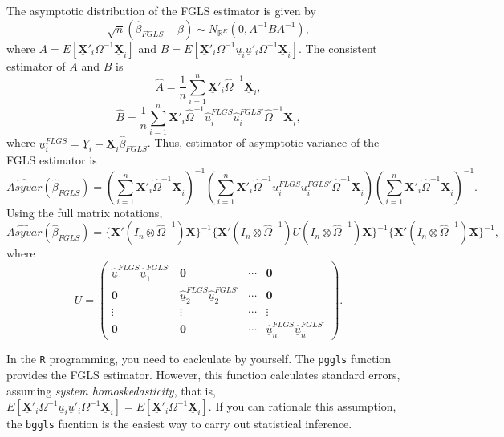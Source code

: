 \documentclass[
  12pt,
]{article}
\begin{document}
The asymptotic distribution of the FGLS estimator is given by
\[
  \sqrt{n}(\hat{\beta}_{FGLS} - \beta) \sim N_{\mathbb{R}^K}(0, A^{-1} B A^{-1}),
\]
where \(A = E[\underline{\mathbf{X}}'_i \Omega^{-1} \underline{\mathbf{X}}_i]\)
and \(B = E[\underline{\mathbf{X}}'_i \Omega^{-1} \underline{u}_i \underline{u}'_i \Omega^{-1} \underline{\mathbf{X}}_i]\).
The consistent estimator of \(A\) and \(B\) is
\[
  \hat{A} = \frac{1}{n} \sum_{i=1}^n \underline{\mathbf{X}}'_i \hat{\Omega}^{-1} \underline{\mathbf{X}}_i,
\]
\[
  \hat{B} 
  = \frac{1}{n} \sum_{i=1}^n
  \underline{\mathbf{X}}'_i \hat{\Omega}^{-1} 
  \underline{\hat{u}}^{FLGS}_i \underline{\hat{u}}^{FGLS'}_i 
  \hat{\Omega}^{-1} \underline{\mathbf{X}}_i,
\]
where \(\underline{u}^{FLGS}_i = \underline{Y}_i - \underline{\mathbf{X}}_i \hat{\beta}_{FGLS}\).
Thus, estimator of asymptotic variance of the FGLS estimator is
\[
  \widehat{Asyvar}(\hat{\beta}_{FGLS}) =
  \left( \sum_{i=1}^n \underline{\mathbf{X}}'_i \hat{\Omega}^{-1} \underline{\mathbf{X}}_i \right)^{-1}
  \left( \sum_{i=1}^n \underline{\mathbf{X}}'_i \hat{\Omega}^{-1} 
  \underline{u}^{FLGS}_i \underline{u}^{FGLS'}_i 
  \hat{\Omega}^{-1} \underline{\mathbf{X}}_i \right)
  \left( \sum_{i=1}^n \underline{\mathbf{X}}'_i \hat{\Omega}^{-1} \underline{\mathbf{X}}_i \right)^{-1}.
\]
Using the full matrix notations,
\[
  \widehat{Asyvar}(\hat{\beta}_{FGLS}) =
  \{ \mathbf{X}'(I_n \otimes \hat{\Omega}^{-1}) \mathbf{X} \}^{-1}
  \{ \mathbf{X}'(I_n \otimes \hat{\Omega}^{-1}) U (I_n \otimes \hat{\Omega}^{-1}) \mathbf{X} \}^{-1}
  \{ \mathbf{X}'(I_n \otimes \hat{\Omega}^{-1}) \mathbf{X} \}^{-1},
\]
where
\[
  U = 
  \begin{pmatrix}
    \underline{\hat{u}}^{FLGS}_1 \underline{\hat{u}}^{FGLS'}_1 & \mathbf{0} & \cdots & \mathbf{0} \\
    \mathbf{0} & \underline{\hat{u}}^{FLGS}_2 \underline{\hat{u}}^{FGLS'}_2 & \cdots & \mathbf{0} \\
    \vdots & \vdots & \cdots & \vdots \\
    \mathbf{0} & \mathbf{0} & \cdots & \underline{\hat{u}}^{FLGS}_n \underline{\hat{u}}^{FGLS'}_n
  \end{pmatrix}.
\]

In the \texttt{R} programming,
you need to caclculate by yourself.
The \texttt{pggls} function provides the FGLS estimator.
However, this function calculates standard errors, assuming \emph{system homoskedasticity}, that is,
\(E[\underline{\mathbf{X}}'_i \Omega^{-1} \underline{u}_i \underline{u}'_i \Omega^{-1} \underline{\mathbf{X}}_i] = E[\underline{\mathbf{X}}'_i \Omega^{-1} \underline{\mathbf{X}}_i]\).
If you can rationale this assumption,
the \texttt{bggls} fucntion is the easiest way to carry out statistical inference.
\end{document}

